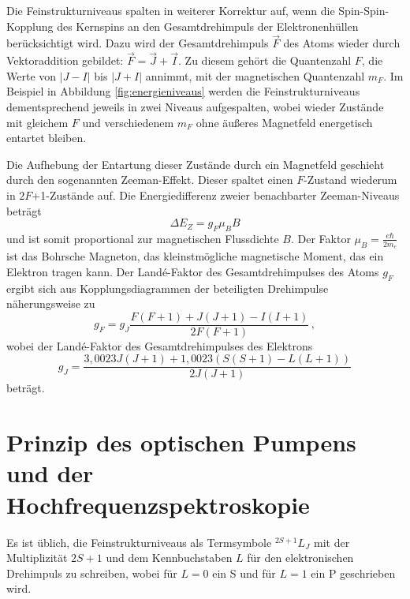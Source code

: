   Die Feinstrukturniveaus spalten in weiterer Korrektur auf, wenn die Spin-Spin-Kopplung des Kernspins an den Gesamtdrehimpuls der Elektronenhüllen berücksichtigt wird. Dazu wird der Gesamtdrehimpuls $\vec{F}$ des Atoms wieder durch Vektoraddition gebildet: $\vec{F} = \vec{J} + \vec{I}$. Zu diesem gehört die Quantenzahl $F$, die Werte von $\lvert J - I \rvert$ bis $\lvert J + I \rvert$ annimmt, mit der magnetischen Quantenzahl $m_F$. Im Beispiel in Abbildung \ref{fig:energieniveaus} werden die Feinstrukturniveaus dementsprechend jeweils in zwei Niveaus aufgespalten, wobei wieder Zustände mit gleichem $F$ und verschiedenem $m_F$ ohne äußeres Magnetfeld energetisch entartet bleiben.

  Die Aufhebung der Entartung dieser Zustände durch ein Magnetfeld geschieht durch den sogenannten Zeeman-Effekt. Dieser spaltet einen $F$-Zustand wiederum in $2F$+1-Zustände auf. Die Energiedifferenz zweier benachbarter Zeeman-Niveaus beträgt
  \begin{equation}
    \Delta E_Z = g_F \mu_B B
    \label{eqn:zeemanDifferenz}
  \end{equation}
  und ist somit proportional zur magnetischen Flussdichte $B$. Der Faktor $\mu_B = \frac{e \hbar}{2m_e}$ ist das Bohrsche Magneton, das kleinstmögliche magnetische Moment, das ein Elektron tragen kann. Der Landé-Faktor des Gesamtdrehimpulses des Atoms $g_F$ ergibt sich aus Kopplungsdiagrammen der beteiligten Drehimpulse näherungsweise zu
  \begin{equation}
    g_F = g_J \frac{F(F+1)+J(J+1)-I(I+1)}{2F(F+1)}\,,
    \label{eqn:g_F_Theorie}
  \end{equation}
  wobei der Landé-Faktor des Gesamtdrehimpulses des Elektrons
  \begin{equation}
    g_J = \frac{3,0023J(J+1)+1,0023(S(S+1)-L(L+1))}{2J(J+1)}
    \label{eqn:g_J_Theorie}
  \end{equation}
  beträgt.

  \section{Prinzip des optischen Pumpens und der Hochfrequenzspektroskopie}
  \label{subsec:prinzipOptischesPumpen}

  Es ist üblich, die Feinstrukturniveaus als Termsymbole ${}^{2S+1}L_J$ mit der Multiplizität $2S+1$ und dem Kennbuchstaben $L$ für den elektronischen Drehimpuls zu schreiben, wobei für $L=0$ ein S und für $L=1$ ein P geschrieben wird.

